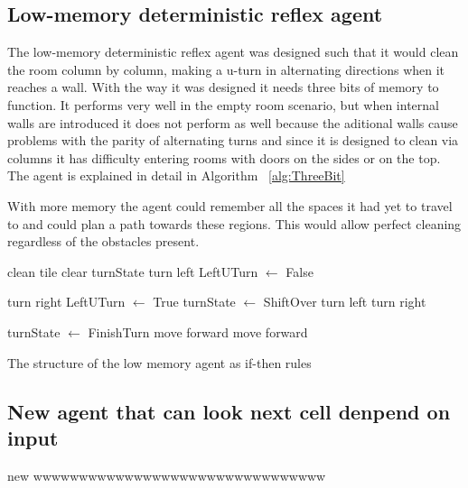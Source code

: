 \documentclass{article}
\begin{document}
\subsection{Low-memory deterministic reflex agent}
The low-memory deterministic reflex agent was designed such that it would clean the room column by column, making a u-turn in alternating directions when it reaches a wall. With the way it was designed it needs three bits of memory to function. It performs very well in the empty room scenario, but when internal walls are introduced it does not perform as well because the aditional walls cause problems with the parity of alternating turns and since it is designed to clean via columns it has difficulty entering rooms with doors on the sides or on the top. The agent is explained in detail in Algorithm ~\ref{alg:ThreeBit}

With more memory the agent could remember all the spaces it had yet to travel to and could plan a path towards these regions. This would allow perfect cleaning regardless of the obstacles present.
\begin{algorithm}
  \begin{algorithmic}[1]
        \State clean tile
      \Else 
          \State clear turnState
            \State turn left
            \State LeftUTurn $\gets$ False
            
          \Else
            \State turn right
            \State LeftUTurn $\gets$ True
          \EndIf
        \EndIf
          \State turnState $\gets$ ShiftOver
            \State turn left
          \Else
            \State turn right
          \EndIf
          
        \Else
            \State turnState $\gets$ FinishTurn
            \State move forward
          \Else
            \State move forward
          \EndIf
        \EndIf
      \EndIf
    \EndFor
  \end{algorithmic}\caption{The structure of the low memory agent as if-then rules}
  \label{alg:ThreeBit}
\end{algorithm}

\subsection{New agent that can look next cell denpend on input }
new wwwwwwwwwwwwwwwwwwwwwwwwwwwwwwww
\end{document}
